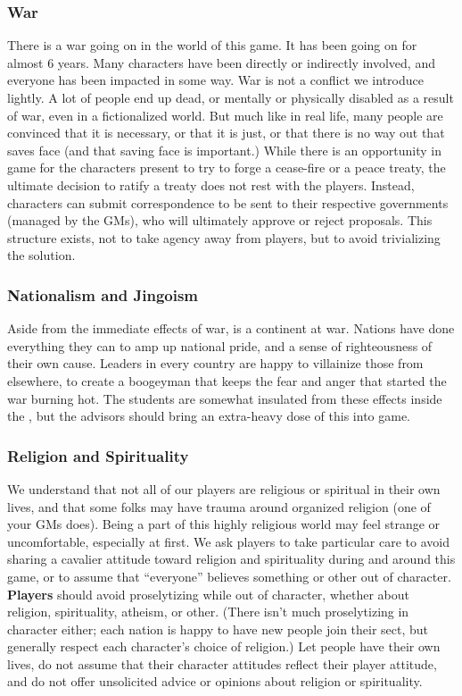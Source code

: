 \documentclass[sheet]{GL2020}
\begin{document}
\subsubsection{War}
There is a war going on in the world of this game. It has been going on for almost 6 years. Many characters have been directly or indirectly involved, and everyone has been impacted in some way. War is not a conflict we introduce lightly. A lot of people end up dead, or mentally or physically disabled as a result of war, even in a fictionalized world. But much like in real life, many people are convinced that it is necessary, or that it is just, or that there is no way out that saves face (and that saving face is important.) While there is an opportunity in game for the characters present to try to forge a cease-fire or a peace treaty, the ultimate decision to ratify a treaty does not rest with the players. Instead, characters can submit correspondence to be sent to their respective governments (managed by the GMs), who will ultimately approve or reject proposals. This structure exists, not to take agency away from players, but to avoid trivializing the solution. 

\subsubsection{Nationalism and Jingoism}
Aside from the immediate effects of war, \pEarth{} is a continent at war. Nations have done everything they can to amp up national pride, and a sense of righteousness of their own cause. Leaders in every country are happy to villainize those from elsewhere, to create a boogeyman that keeps the fear and anger that started the war burning hot. The students are somewhat insulated from these effects inside the \pSchool{}, but the advisors should bring an extra-heavy dose of this into game.

\subsubsection{Religion and Spirituality}
We understand that not all of our players are religious or spiritual in their own lives, and that some folks may have trauma around organized religion (one of your GMs does). Being a part of this highly religious world may feel strange or uncomfortable, especially at first. We ask players to take particular care to avoid sharing a cavalier attitude toward religion and spirituality during and around this game, or to assume that ``everyone'' believes something or other out of character. \textbf{Players} should avoid proselytizing while out of character, whether about religion, spirituality, atheism, or other. (There isn't much proselytizing in character either; each nation is happy to have new people join their sect, but generally respect each character's choice of religion.) Let people have their own lives, do not assume that their character attitudes reflect their player attitude, and do not offer unsolicited advice or opinions about religion or spirituality.
\end{document}
